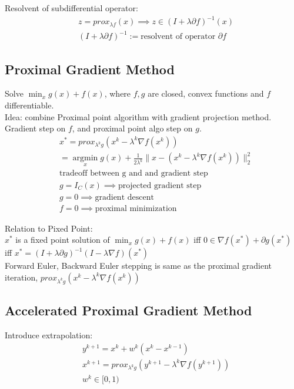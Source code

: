 \documentclass[8pt,letter]{article}
\DeclareMathOperator*{\argmin}{argmin}
\newcommand*{\argminl}{\argmin\limits}
\begin{document}
\begin{multicols*}{2}
  Resolvent of subdifferential operator:
  \begin{align*}
    &z=prox_{\lambda f}(x) \implies z \in (I+\lambda \partial f)^{-1}(x)\\
    &(I+\lambda \partial f)^{-1} :=\text{resolvent of operator }\partial f
  \end{align*}
  
  \subsection{Proximal Gradient Method}
  Solve $\min_{x} g(x)+f(x)$, where $f,g$ are closed, convex functions and $f$ differentiable.\\
  
  Idea: combine Proximal point algorithm with gradient projection method. Gradient step on $f$, and proximal point algo step on $g$.
  \begin{align*}
    &x^* = prox_{\lambda^k g}(x^k-\lambda^k \nabla f(x^k)) \\
    &=\argminl_{x} g(x) + \frac{1}{2 \lambda^k} \|x - (x^k - \lambda^k \nabla f(x^k))\|_2^2\\
    &\text{tradeoff between g and and gradient step}\\
    &g=I_C(x) \implies \text{projected gradient step}\\
    &g=0 \implies \text{gradient descent}\\
    &f=0 \implies \text{proximal minimization}
  \end{align*}

  Relation to Pixed Point:\\
  $x^*$ is a fixed point solution of $\min_{x} g(x)+f(x)$ iff $0 \in \nabla f(x^*) + \partial g(x^*)$ iff $x^* = (I+\lambda \partial g)^{-1}(I-\lambda \nabla f)(x^*)$\\
  
  Forward Euler, Backward Euler stepping is same as the proximal gradient iteration, $prox_{\lambda^k g}(x^k-\lambda^k \nabla f(x^k))$\\

  \subsection{Accelerated Proximal Gradient Method}
  Introduce extrapolation:
  \begin{align*}
    &y^{k+1} = x^k + w^k(x^k-x^{k-1})\\
    &x^{k+1} = prox_{\lambda^k g}(y^{k+1}-\lambda^k \nabla f(y^{k+1}))\\
    &w^k \in [0,1)
  \end{align*}


\end{multicols*}
\end{document}
